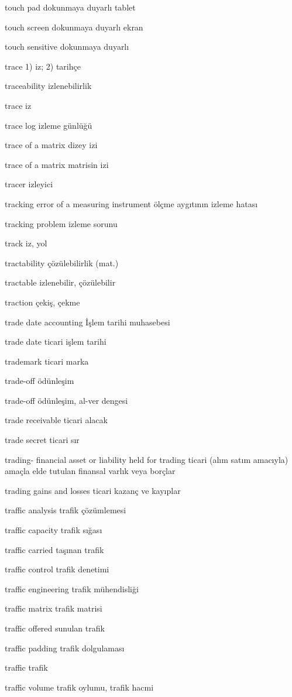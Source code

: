 \documentclass[12pt,fleqn]{article}\usepackage{../../common}
\begin{document}
touch pad dokunmaya duyarlı tablet

touch screen dokunmaya duyarlı ekran

touch sensitive dokunmaya duyarlı

trace 1) iz; 2) tarihçe

traceability izlenebilirlik

trace iz

trace log izleme günlüğü

trace of a matrix dizey izi

trace of a matrix matrisin izi

tracer izleyici

tracking error of a measuring instrument ölçme aygıtının izleme hatası

tracking problem izleme sorunu

track iz, yol

tractability çözülebilirlik (mat.)

tractable izlenebilir, çözülebilir

traction çekiş, çekme

trade date accounting İşlem tarihi muhasebesi

trade date ticari işlem tarihi

trademark ticari marka

trade-off ödünleşim

trade-off ödünleşim, al-ver dengesi

trade receivable ticari alacak

trade secret ticari sır

trading- financial asset or liability held for trading ticari (alım satım amacıyla) amaçla elde tutulan finansal varlık veya borçlar

trading gains and losses ticari kazanç ve kayıplar

traffic analysis trafik çözümlemesi

traffic capacity trafik sığası

traffic carried taşınan trafik

traffic control trafik denetimi

traffic engineering trafik mühendisliği

traffic matrix trafik matrisi

traffic offered sunulan trafik

traffic padding trafik dolgulaması

traffic trafik

traffic volume trafik oylumu, trafik hacmi
\end{document}
